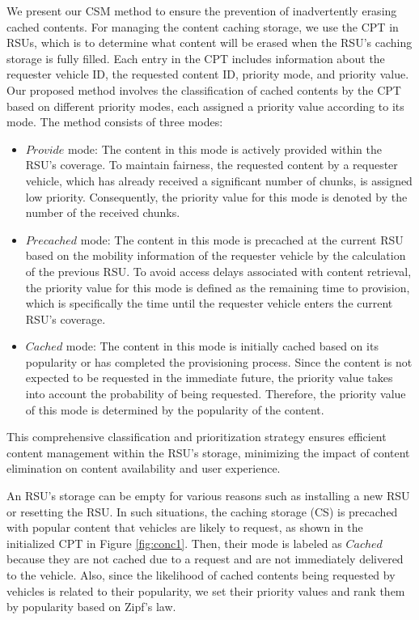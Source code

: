 \documentclass[journal]{IEEEtran}
\begin{document}
We present our CSM method to ensure the prevention of inadvertently erasing cached contents.
For managing the content caching storage, we use the CPT in RSUs, which is to determine what content will be erased when the RSU's caching storage is fully filled.
Each entry in the CPT includes information about the requester vehicle ID, the requested content ID, priority mode, and priority value.
Our proposed method involves the classification of cached contents by the CPT based on different priority modes, each assigned a priority value according to its mode.
The method consists of three modes:
\begin{itemize}
    \item $Provide$ mode: 
    The content in this mode is actively provided within the RSU's coverage.
    To maintain fairness, the requested content by a requester vehicle, which has already received a significant number of chunks, is assigned low priority.
    Consequently, the priority value for this mode is denoted by the number of the received chunks.
    
    \item $Precached$ mode:
    The content in this mode is precached at the current RSU based on the mobility information of the requester vehicle by the calculation of the previous RSU.
    To avoid access delays associated with content retrieval, the priority value for this mode is defined as the remaining time to provision, which is specifically the time until the requester vehicle enters the current RSU's coverage.
    
    \item $Cached$ mode:
    The content in this mode is initially cached based on its popularity or has completed the provisioning process.
    Since the content is not expected to be requested in the immediate future, the priority value takes into account the probability of being requested.
    Therefore, the priority value of this mode is determined by the popularity of the content.
\end{itemize}
This comprehensive classification and prioritization strategy ensures efficient content management within the RSU's storage, minimizing the impact of content elimination on content availability and user experience.

An RSU's storage can be empty for various reasons such as installing a new RSU or resetting the RSU.
In such situations, the caching storage (CS) is precached with popular content that vehicles are likely to request, as shown in the initialized CPT in Figure \ref{fig:conc1}.
Then, their mode is labeled as $Cached$ because they are not cached due to a request and are not immediately delivered to the vehicle.
Also, since the likelihood of cached contents being requested by vehicles is related to their popularity, we set their priority values and rank them by popularity based on Zipf's law.
\end{document}
